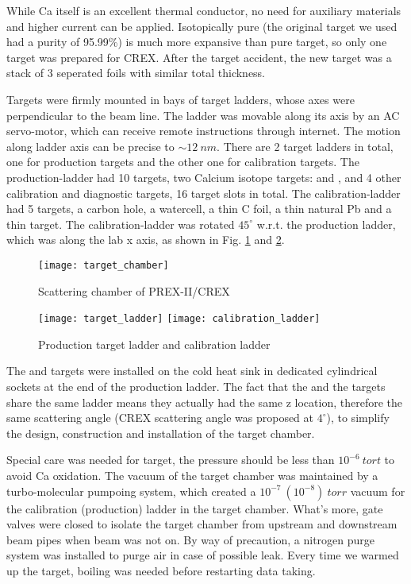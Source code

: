While Ca itself is an excellent thermal conductor, no need for auxiliary 
materials and higher current can be applied. Isotopically pure \Ca (the original
target we used had a purity of 95.99\%) is much more 
expansive than pure \Pb target, so only one \Ca target was prepared for CREX. 
After the target accident, 
the new \Ca target was a stack of 3 seperated foils with similar total thickness.

Targets were firmly mounted in bays of target ladders, whose axes were 
perpendicular to the beam line. The ladder was movable along its axis by an 
AC servo-motor, which can receive remote instructions through internet. 
The motion along ladder axis can be precise to $\sim12\ nm$.
There are 2 target ladders in total, one for production targets and the other
one for calibration targets. The production-ladder had 10 \Pb targets, 
two Calcium isotope targets: \ca and \Ca, and 4 other calibration and diagnostic
targets, 16 target slots in total. The calibration-ladder had 5 targets, a carbon 
hole, a watercell, a thin C foil, a thin natural Pb and a thin \ca target.
The calibration-ladder was rotated $45^\circ$ w.r.t. the production ladder, 
which was along the lab x axis, as shown in Fig. \ref{fig:scattering_chamber}
and \ref{fig:target_ladder}.

\begin{figure}[h!]
    \centering
    \texttt{[image: target\_chamber]}
    \caption{Scattering chamber of PREX-II/CREX}
    \label{fig:scattering_chamber}
\end{figure}
\begin{figure}[h!]
    \centering
    \texttt{[image: target\_ladder]}
    \texttt{[image: calibration\_ladder]}
    \caption{Production target ladder and calibration ladder}
    \label{fig:target_ladder}
\end{figure}

The \ca and \Ca targets were installed on the cold heat sink in dedicated cylindrical 
sockets at the end of the production ladder. %
The fact that the \Ca and the \Pb 
targets share the same ladder means they actually had the same z location,
therefore the same scattering angle (CREX scattering angle was proposed at $4^\circ$), 
to simplify the design, construction and installation of the target chamber.

Special care was needed for \Ca target, the pressure should be less than $10^{-6}\ tort$
to avoid Ca oxidation. The vacuum of the target chamber was maintained by a 
turbo-molecular pumpoing system, which created a $10^{-7}\ (10^{-8})\ torr$ vacuum 
for the calibration (production) ladder in the target chamber. What's more,
gate valves were closed to isolate the target chamber from upstream and downstream
beam pipes when beam was not on. By way of precaution, a nitrogen purge system 
was installed to purge air in case of possible leak.
Every time we warmed up the \Ca target, boiling was needed before restarting data taking.

